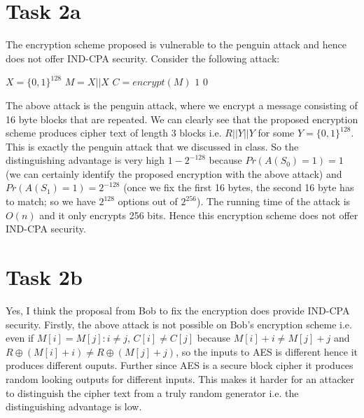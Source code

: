 \documentclass{article}
\begin{document}
    \section*{Task 2a}
    The encryption scheme proposed is vulnerable to the penguin attack and hence does not offer IND-CPA security. Consider the following attack:

    \begin{algorithm}[H]
        \begin{algorithmic}
                \State $X = \{0, 1\}^{128}$
                \State $M = X || X$
                \State $C = encrypt(M)$
                    \State \Return $1$
                \Else
                    \State \Return $0$
                \EndIf
            \EndProcedure
        \end{algorithmic}
    \end{algorithm}
    
    The above attack is the penguin attack, where we encrypt a message consisting of 16 byte blocks that are repeated. We can clearly see that the proposed encryption scheme produces cipher text of length 3 blocks i.e. $R || Y || Y$ for some $Y = \{0, 1\}^{128}$. This is exactly the penguin attack that we discussed in class. So the distinguishing advantage is very high $1 - 2^{-128}$ because $Pr(A(S_0) = 1) = 1$ (we can certainly identify the proposed encryption with the above attack) and $Pr(A(S_1) = 1) = 2^{-128}$ (once we fix the first 16 bytes, the second 16 byte has to match; so we have $2^{128}$ options out of $2^{256}$). The running time of the attack is $O(n)$ and it only encrypts 256 bits. Hence this encryption scheme does not offer IND-CPA security.

    \section*{Task 2b}
    Yes, I think the proposal from Bob to fix the encryption does provide IND-CPA security. Firstly, the above attack is not possible on Bob's encryption scheme i.e. even if $M[i] = M[j]: i \ne j$, $C[i] \ne C[j]$ because $M[i] + i \ne M[j] + j$ and $R \oplus (M[i] + i ) \ne R \oplus (M[j] + j)$, so the inputs to AES is different hence it produces different ouputs. Further since AES is a secure block cipher it produces random looking outputs for different inputs. This makes it harder for an attacker to distinguish the cipher text from a truly random generator i.e. the distinguishing advantage is low.
    
\end{document}
